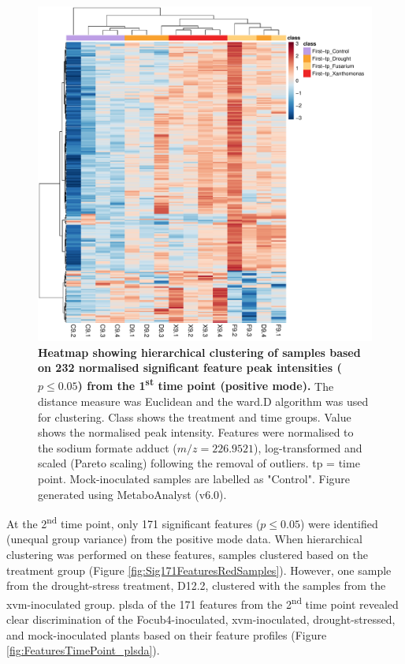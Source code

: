 \begin{figure}[hp!]
  \centering
  \includegraphics[width=\textwidth]{Figures/Sig232Features_heatmap_9_dpi72-ForThesis.pdf}
  \caption[Heatmap showing hierarchical clustering of samples based on 232 normalised significant feature peak intensities ($p \le0.05$) from the 1\textsuperscript{st} time point (positive mode).]{\textbf{Heatmap showing hierarchical clustering of samples based on 232 normalised significant feature peak intensities ($p \le0.05$) from the 1\textsuperscript{st} time point (positive mode).} The distance measure was Euclidean and the ward.D algorithm was used for clustering. Class shows the treatment and time groups. Value shows the normalised peak intensity. Features were normalised to the sodium formate   adduct ($m/z=226.9521$), log-transformed and scaled (Pareto scaling) following the removal of outliers. tp = time point. Mock-inoculated samples are labelled as "Control". Figure generated using MetaboAnalyst (v6.0).}
  \label{fig:Sig232FeaturesRedSamples}
\end{figure}

At the 2\textsuperscript{nd} time point, only 171 significant features ($p \le0.05$) were identified (unequal group variance) from the positive mode data. When hierarchical clustering was performed on these features, samples clustered based on the treatment group (Figure \ref{fig:Sig171FeaturesRedSamples}). However, one sample from the drought-stress treatment, D12.2, clustered with the samples from the \ac{xvm}-inoculated group. \Ac{plsda} of the 171 features from the 2\textsuperscript{nd} time point revealed clear discrimination of the \ac{Focub4}-inoculated, \ac{xvm}-inoculated, drought-stressed, and mock-inoculated plants based on their feature profiles (Figure \ref{fig:FeaturesTimePoint_plsda}). 

